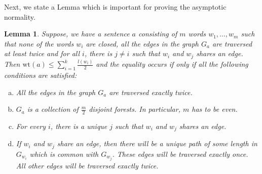 \documentclass[reqno,12pt]{amsart}
\theoremstyle{plain}
\newtheorem{lemma}{Lemma}
\theoremstyle{definition}
\begin{document}
Next, we state a Lemma which is important for proving the asymptotic normality.
\begin{lemma}\label{lem:clt}
    Suppose, we have a sentence $a$ consisting of $m$ words $w_{1},\ldots,w_{m}$ such that none of the words $w_{i}$ are closed, all the edges in the graph $G_{a}$ are traversed at least twice and for all $i$, there is $j\neq i$ such that $w_{i}$ and $w_{j}$ shares an edge. Then $ \mathrm{wt}(a) \le \sum_{i=1}^{k} \frac{l(w_{i})}{2} $ and the equality occurs if only if all the following conditions are satisfied: 
    \begin{enumerate}[(a)]
        \item All the edges in the graph $G_{a}$ are traversed exactly twice.
        \item $G_{a}$ is a collection of $\frac{m}{2}$ disjoint forests. In particular, $m$ has to be even.
        \item For every $i$, there is a unique $j$ such that $w_{i}$ and $w_{j}$ shares an edge.
        \item If $w_{i}$ and $w_{j}$ share an edge, then there will be a unique path of some length in $G_{w_{i}}$ which is common with $G_{w_{j}}$. These edges will be traversed exactly once. All other edges will be traversed exactly twice.
    \end{enumerate}
\end{lemma}
\end{document}
